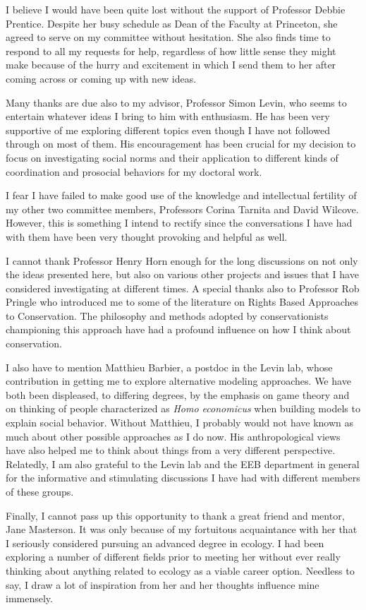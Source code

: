 \documentclass{report}
\begin{document}
I believe I would have been quite lost without the support of Professor Debbie Prentice. Despite her busy schedule as Dean of the Faculty at Princeton, she agreed to serve on my committee without hesitation. She also finds time to respond to all my requests for help, regardless of how little sense they might make because of the hurry and excitement in which I send them to her after coming across or coming up with new ideas.

Many thanks are due also to my advisor, Professor Simon Levin, who seems to entertain whatever ideas I bring to him with enthusiasm. He  has been very supportive of me exploring different topics even though I have not followed through on most of them. His encouragement has been crucial for my decision to focus on investigating social norms and their application to different kinds of coordination and prosocial behaviors for my doctoral work.

I fear I have failed to make good use of the knowledge and intellectual fertility of my other two committee members, Professors Corina Tarnita and David Wilcove. However, this is something I intend to rectify since the conversations I have had with them have been very thought provoking and helpful as well.

I cannot thank Professor Henry Horn enough for the long discussions on not only the ideas presented here, but also on various other projects and issues that I have considered investigating at different times. A special thanks also to Professor Rob Pringle who introduced me to some of the literature on Rights Based Approaches to Conservation. The philosophy and methods adopted by conservationists championing this approach have had a profound influence on how I think about conservation.

I also have to mention Matthieu Barbier, a postdoc in the Levin lab, whose contribution in getting me to explore alternative modeling approaches. We have both been displeased, to differing degrees, by the emphasis on game theory and on thinking of people characterized as \textit{Homo economicus} when building models to explain social behavior. Without Matthieu, I probably would not have known as much about other possible approaches as I do now. His anthropological views have also helped me to think about things from a very different perspective. Relatedly, I am also grateful to the Levin lab and the EEB department in general for the informative and stimulating discussions I have had with different members of these groups.

Finally, I cannot pass up this opportunity to thank a great friend and mentor, Jane Masterson. It was only because of my fortuitous acquaintance with her that I seriously considered pursuing an advanced degree in ecology. I had been exploring a number of different fields prior to meeting her without ever really thinking about anything related to ecology as a viable career option. Needless to say, I draw a lot of inspiration from her and her thoughts influence mine immensely.

\tableofcontents




\end{document}
